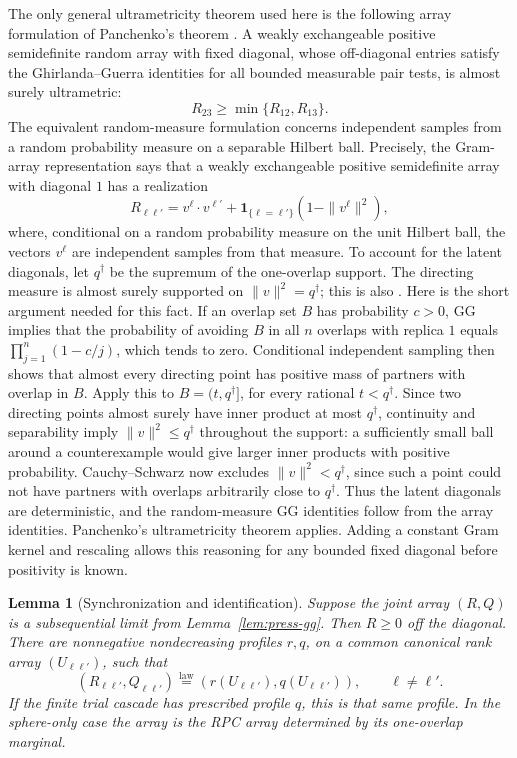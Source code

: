 \documentclass[11pt,a4paper]{article}
\numberwithin{equation}{section}
\newtheorem{lemma}[theorem]{Lemma}
\theoremstyle{definition}
\theoremstyle{remark}
\newcommand{\ind}{\mathbf 1}
\begin{document}
The only general ultrametricity theorem used here is the following
array formulation of Panchenko's theorem \cite[Theorem~1]{Panchenko2013}.
A weakly exchangeable positive semidefinite random array with fixed diagonal,
whose off-diagonal entries satisfy the Ghirlanda--Guerra identities for all
bounded measurable pair tests, is almost surely ultrametric:
\[
 R_{23}\ge\min\{R_{12},R_{13}\}.
\]
The equivalent random-measure formulation concerns independent samples from
a random probability measure on a separable Hilbert ball. Precisely, the
Gram-array representation \cite[Proposition~1]{Panchenko2010DS} says that a weakly
exchangeable positive semidefinite array with diagonal $1$ has a realization
\[
 R_{\ell\ell'}=v^\ell\cdot v^{\ell'}
       +\ind_{\{\ell=\ell'\}}(1-\|v^\ell\|^2),
\]
where, conditional on a random probability measure on the unit Hilbert ball,
the vectors $v^\ell$ are independent samples from that measure. To account for the latent diagonals, let $q^\dagger$ be the supremum of the
one-overlap support. The directing measure is almost surely supported on
$\|v\|^2=q^\dagger$; this is also
\cite[Theorem~2(a)]{Panchenko2010Sphere}. Here is the short argument needed
for this fact. If an overlap set $B$ has probability $c>0$, GG implies that
the probability of avoiding $B$ in all $n$ overlaps with replica $1$ equals
$\prod_{j=1}^n(1-c/j)$, which tends to zero. Conditional independent sampling
then shows that almost every directing point has positive mass of partners
with overlap in $B$. Apply this to $B=(t,q^\dagger]$, for every rational
$t<q^\dagger$. Since two directing points almost surely have inner product
at most $q^\dagger$, continuity and separability imply
$\|v\|^2\le q^\dagger$ throughout the support: a sufficiently small ball
around a counterexample would give larger inner products with positive
probability. Cauchy--Schwarz now excludes $\|v\|^2<q^\dagger$, since such a
point could not have partners with overlaps arbitrarily close to
$q^\dagger$. Thus the latent diagonals are deterministic, and the
random-measure GG identities follow from the array identities. Panchenko's
ultrametricity theorem applies. Adding a constant Gram kernel and rescaling
allows this reasoning for any bounded fixed diagonal before positivity is
known.

\begin{lemma}[Synchronization and identification]\label{lem:press-sync}
Suppose the joint array $(R,Q)$ is a subsequential limit from
Lemma~\ref{lem:press-gg}. Then $R\ge0$ off the diagonal. There are
nonnegative nondecreasing profiles $r,q$, on a common canonical rank array
$(U_{\ell\ell'})$, such that
\[
 (R_{\ell\ell'},Q_{\ell\ell'})
 \stackrel{\mathrm{law}}{=}
 (r(U_{\ell\ell'}),q(U_{\ell\ell'})),\qquad\ell\ne\ell'.
\]
If the finite trial cascade has prescribed profile $q$, this is that same
profile. In the sphere-only case the array is the RPC array determined by its
one-overlap marginal.
\end{lemma}
\end{document}
